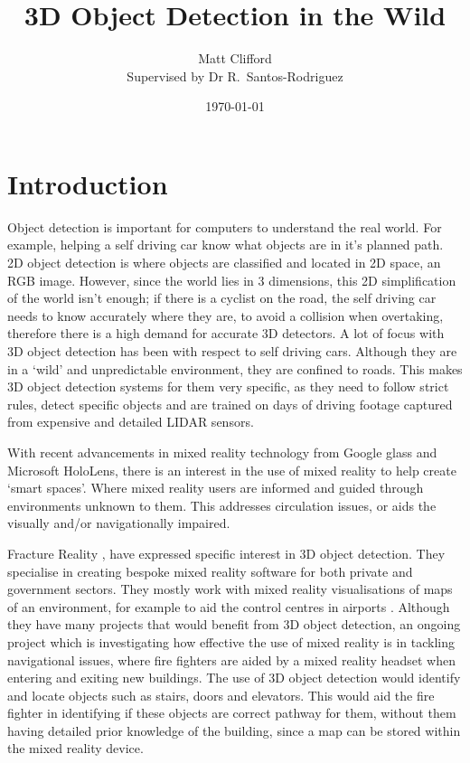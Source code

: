 \documentclass[11pt]{article}
\title{3D Object Detection in the Wild}
\author{Matt Clifford \\ Supervised by Dr R.\ Santos-Rodriguez}
\date{\today}
\begin{document}
\maketitle

\section{Introduction}
Object detection is important for computers to understand the real world. For example, helping a self driving car know what objects are in it's planned path. 2D object detection is where objects are classified and located in 2D space, an RGB image. However, since the world lies in 3 dimensions, this 2D simplification of the world isn't enough; if there is a cyclist on the road, the self driving car needs to know accurately where they are, to avoid a collision when overtaking, therefore there is a high demand for accurate 3D detectors. A lot of focus with 3D object detection has been with respect to self driving cars. Although they are in a `wild' and unpredictable environment, they are confined to roads. This makes 3D object detection systems for them very specific, as they need to follow strict rules, detect specific objects and are trained on days of driving footage captured from expensive and detailed LIDAR sensors. 

With recent advancements in mixed reality technology from Google glass and Microsoft HoloLens, there is an interest in the use of mixed reality to help create `smart spaces'. Where mixed reality users are informed and guided through environments unknown to them. This addresses circulation issues, or aids the visually and/or navigationally impaired.

Fracture Reality \cite{fracture}, have expressed specific interest in 3D object detection. They specialise in creating bespoke mixed reality software for both private and government sectors. They mostly work with mixed reality visualisations of maps of an environment, for example to aid the control centres in airports \cite{youtube}. Although they have many projects that would benefit from 3D object detection, an ongoing project which is investigating how effective the use of mixed reality is in tackling navigational issues, where fire fighters are aided by a mixed reality headset when entering and exiting new buildings. The use of 3D object detection would identify and locate objects such as stairs, doors and elevators. This would aid the fire fighter in identifying if these objects are correct pathway for them, without them having detailed prior knowledge of the building, since a map can be stored within the mixed reality device.
\end{document}
